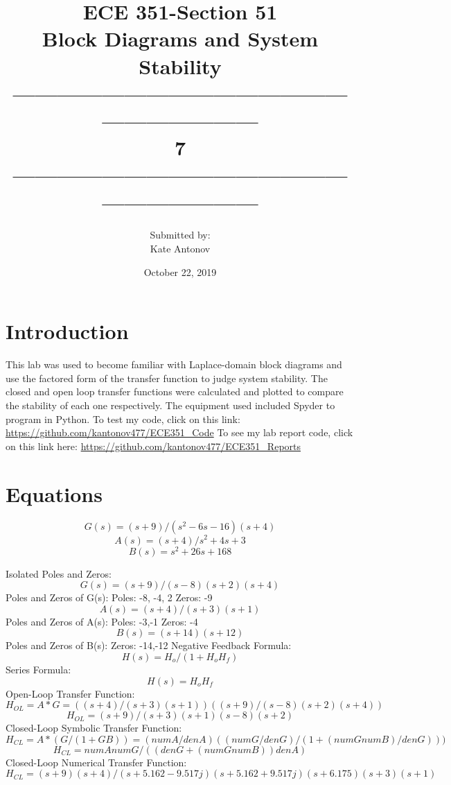 \documentclass[12pt]{article}
\title{ECE 351-Section 51 \\ Block Diagrams and System Stability
 \\ ------------------------------------------------------------------\\ 7 \\------------------------------------------------------------------}
\author{Submitted by: \\  Kate Antonov}
\date{October 22, 2019}
\begin{document}
\vspace{\fill}

\maketitle

\vspace{\fill}
\thispagestyle{empty}
\clearpage

\clearpage
\thispagestyle{empty}
\tableofcontents
\clearpage

\section{Introduction}
This lab was used to become familiar with Laplace-domain block diagrams and use the factored form of the transfer
function to judge system stability.
The closed and open loop transfer functions were calculated and plotted to compare the stability of each one respectively.
The equipment used included Spyder to program in Python. To test my code, click on this link: 
\url{https://github.com/kantonov477/ECE351_Code}
\newline
To see my lab report code, click on this link here: 
\url{https://github.com/kantonov477/ECE351_Reports}
\section{Equations}
\[G(s) = (s + 9)/(s^2 − 6s − 16)(s + 4) \]
\[A(s) =  (s + 4)/s^2 + 4s + 3\]
\[B(s) = s^2 + 26s + 168 \]

Isolated Poles and Zeros:
\[G(s) = (s + 9)/(s - 8)(s + 2)(s + 4) \]
Poles and Zeros of G(s):\newline
Poles: -8, -4, 2\newline
Zeros: -9\newline
\[A(s) = (s + 4)/(s + 3)(s + 1) \]
Poles and Zeros of A(s):\newline
Poles: -3,-1\newline
Zeros: -4\newline
\[B(s) = (s + 14)(s + 12) \]
Poles and Zeros of B(s):\newline
Zeros: -14,-12\newline
Negative Feedback Formula:
\[H(s) = H_o/(1+ H_oH_f)\]
Series Formula:
\[H(s) = H_oH_f\]
Open-Loop Transfer Function:
\[H_{OL} = A*G = ((s + 4)/(s + 3)(s + 1))((s + 9)/(s - 8)(s + 2)(s + 4))\]
\[H_{OL} = (s + 9)/(s + 3)(s + 1)(s - 8)(s + 2)\]
Closed-Loop Symbolic Transfer Function:
\[H_{CL} = A*(G/(1 + GB)) = (numA/denA)((numG/denG)/(1 + (numGnumB)/denG)))\]
\[H_{CL}= numAnumG/((denG + (numGnumB))denA)\]
Closed-Loop Numerical Transfer Function:
\[H_{CL}= (s + 9)(s + 4)/(s + 5.162 - 9.517j)(s + 5.162 + 9.517j)(s + 6.175)(s + 3)(s + 1)\]
\end{document}
